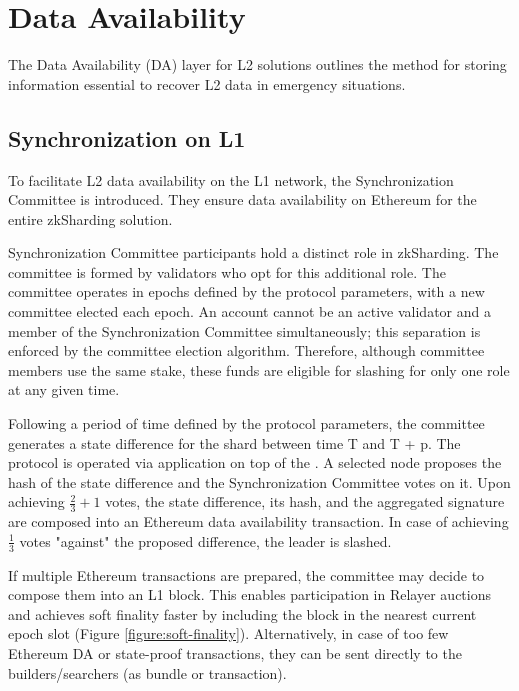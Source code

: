 \section{Data Availability}
\label{section:data-availability}

The Data Availability (DA) layer for L2 solutions outlines the method for storing 
information essential to recover L2 data in emergency situations.


\subsection{Synchronization on L1}
\label{section:data-availability:synchronization-on-l1}

To facilitate L2 data availability on the L1 network, the Synchronization Committee is introduced.
They ensure data availability on Ethereum for the entire 
zkSharding solution. 

Synchronization Committee participants hold a distinct role in zkSharding. 
The committee is formed by validators who opt for this additional role.
The committee operates in epochs defined by the protocol parameters,
 with a new committee elected each epoch.
An account cannot be an active validator 
 and a member of the Synchronization Committee simultaneously; 
 this separation is enforced by the committee election algorithm.
Therefore, although committee members use the same stake, 
 these funds are eligible for slashing for only one role at any given time.

Following a period of time defined by the protocol parameters, 
 the committee generates a state difference for the shard between time T and T + p.
The protocol is operated via application on top of the \mainshard.
A selected node proposes the hash of the state difference and the Synchronization Committee votes on it. 
Upon achieving $\frac{2}{3} + 1$ votes, the state difference, its hash, and the aggregated signature 
 are composed into an Ethereum data availability transaction. 
In case of achieving $\frac{1}{3}$ votes "against" the proposed difference, the leader is slashed.

If multiple Ethereum transactions are prepared, the committee may 
decide to compose them into an L1 block. This enables participation in Relayer auctions and 
achieves soft finality faster by including the block in the nearest current epoch slot (Figure \ref{figure:soft-finality}). 
Alternatively, in case of too few Ethereum DA or state-proof transactions, they can be sent 
directly to the builders/searchers (as bundle or transaction).

